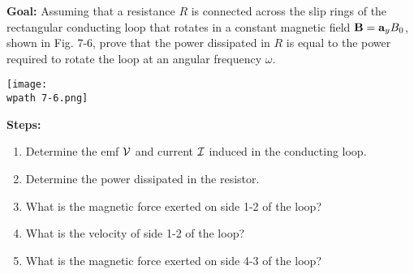 \documentclass[../../header.tex]{subfiles}
\begin{document}
\textbf{Goal:} Assuming that a resistance $R$ is connected across the slip rings of the rectangular conducting loop that rotates in a constant magnetic field $\mathbf{B} = \mathbf{a}_y B_0$, shown in Fig. 7-6, prove that the power dissipated in $R$ is equal to the power required to rotate the loop at an angular frequency $\omega$.\\
\begin{center}
\texttt{[image: \\wpath 7-6.png]}
\end{center}

\textbf{Steps:} 
\begin{enumerate}
\item Determine the emf ${\cal V}$ and current ${\cal I}$ induced in the conducting loop.


\item Determine the power dissipated in the resistor.


\item What is the magnetic force exerted on side 1-2 of the loop?


\item What is the velocity of side 1-2 of the loop?


\item What is the magnetic force exerted on side 4-3 of the loop?



\end{enumerate}
\end{document}
